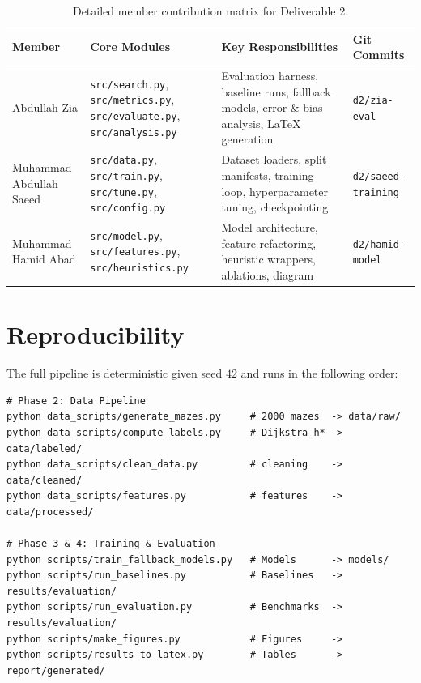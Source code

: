 \documentclass[11pt]{article}
\begin{document}
\begin{table}[H]
\centering
\small
\begin{tabular}{lp{4.2cm}p{4.2cm}l}
\toprule
\textbf{Member} & \textbf{Core Modules} & \textbf{Key Responsibilities} & \textbf{Git Commits} \\
\midrule
Abdullah Zia & \texttt{src/search.py}, \texttt{src/metrics.py}, \texttt{src/evaluate.py}, \texttt{src/analysis.py} & Evaluation harness, baseline runs, fallback models, error \& bias analysis, LaTeX generation & \texttt{d2/zia-eval} \\
Muhammad Abdullah Saeed & \texttt{src/data.py}, \texttt{src/train.py}, \texttt{src/tune.py}, \texttt{src/config.py} & Dataset loaders, split manifests, training loop, hyperparameter tuning, checkpointing & \texttt{d2/saeed-training} \\
Muhammad Hamid Abad & \texttt{src/model.py}, \texttt{src/features.py}, \texttt{src/heuristics.py} & Model architecture, feature refactoring, heuristic wrappers, ablations, diagram & \texttt{d2/hamid-model} \\
\bottomrule
\end{tabular}
\caption{Detailed member contribution matrix for Deliverable 2.}
\label{tab:contributions}
\end{table}


\section{Reproducibility}
The full pipeline is deterministic given seed $42$ and runs in the following order:

\begin{verbatim}
# Phase 2: Data Pipeline
python data_scripts/generate_mazes.py     # 2000 mazes  -> data/raw/
python data_scripts/compute_labels.py     # Dijkstra h* -> data/labeled/
python data_scripts/clean_data.py         # cleaning    -> data/cleaned/
python data_scripts/features.py           # features    -> data/processed/

# Phase 3 & 4: Training & Evaluation
python scripts/train_fallback_models.py   # Models      -> models/
python scripts/run_baselines.py           # Baselines   -> results/evaluation/
python scripts/run_evaluation.py          # Benchmarks  -> results/evaluation/
python scripts/make_figures.py            # Figures     -> 
python scripts/results_to_latex.py        # Tables      -> report/generated/
\end{verbatim}
\end{document}
